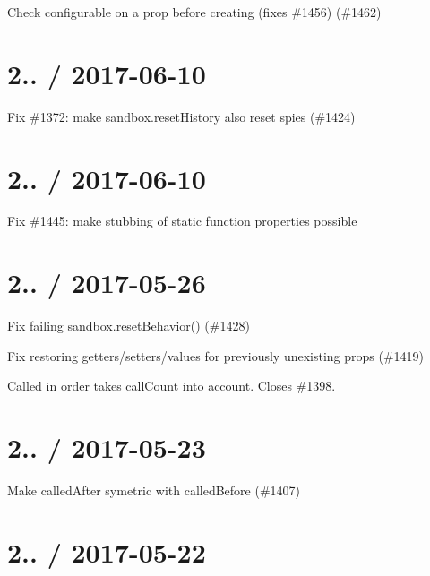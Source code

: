 \begin{DoxyItemize}
\item Check configurable on a prop before creating (fixes \#1456) (\#1462)
\end{DoxyItemize}

\section*{2.. / 2017-\/06-\/10 }


\begin{DoxyItemize}
\item Fix \#1372\+: make sandbox.\+reset\+History also reset spies (\#1424)
\end{DoxyItemize}

\section*{2.. / 2017-\/06-\/10 }


\begin{DoxyItemize}
\item Fix \#1445\+: make stubbing of static function properties possible
\end{DoxyItemize}

\section*{2.. / 2017-\/05-\/26 }


\begin{DoxyItemize}
\item Fix failing sandbox.\+reset\+Behavior() (\#1428)
\item Fix restoring getters/setters/values for previously unexisting props (\#1419)
\item Called in order takes call\+Count into account. Closes \#1398.
\end{DoxyItemize}

\section*{2.. / 2017-\/05-\/23 }


\begin{DoxyItemize}
\item Make called\+After symetric with called\+Before (\#1407)
\end{DoxyItemize}

\section*{2.. / 2017-\/05-\/22 }


